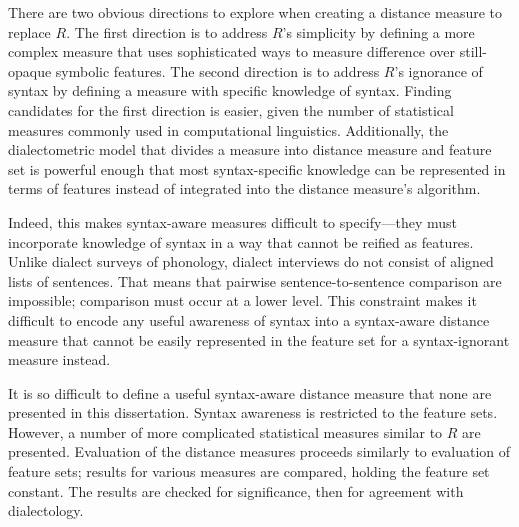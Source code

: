 
There are two obvious directions to explore when creating a distance
measure to replace $R$. The first direction is to address $R$'s
simplicity by defining a more complex measure that uses sophisticated
ways to measure difference over still-opaque symbolic features. The
second direction is to address $R$'s ignorance of syntax by defining a
measure with specific knowledge of syntax. Finding candidates for the
first direction is easier, given the number of statistical measures
commonly used in computational linguistics. Additionally, the
dialectometric model that divides a measure into distance measure and
feature set is powerful enough that most syntax-specific knowledge can
be represented in terms of features instead of integrated into the
distance measure's algorithm.

Indeed, this makes syntax-aware measures difficult to
specify---they must incorporate knowledge of syntax in a way that
cannot be reified as features. Unlike dialect surveys of phonology,
dialect interviews do not consist of aligned lists of sentences. That
means that pairwise sentence-to-sentence comparison are impossible;
comparison must occur at a lower level. This constraint makes it
difficult to encode any useful awareness of syntax into a syntax-aware
distance measure that cannot be easily represented in the feature set
for a syntax-ignorant measure instead.

It is so difficult to define a useful syntax-aware distance measure
that none are presented in this dissertation. Syntax awareness is
restricted to the feature sets. However, a number of more complicated
statistical measures similar to $R$ are presented. Evaluation of the
distance measures proceeds similarly to evaluation of feature sets;
results for various measures are compared, holding the feature set
constant. The results are checked for significance, then for agreement
with dialectology.



